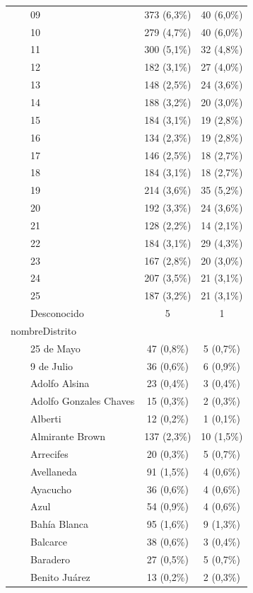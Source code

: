 \documentclass[
  spanish,
  a4paper,
]{scrreprt}
\begin{document}
\begin{table}
{\begin{tabular*}{\linewidth}{@{\extracolsep{\fill}}lcc}
    09 & 373 (6,3\%) & 40 (6,0\%) \\ 
    10 & 279 (4,7\%) & 40 (6,0\%) \\ 
    11 & 300 (5,1\%) & 32 (4,8\%) \\ 
    12 & 182 (3,1\%) & 27 (4,0\%) \\ 
    13 & 148 (2,5\%) & 24 (3,6\%) \\ 
    14 & 188 (3,2\%) & 20 (3,0\%) \\ 
    15 & 184 (3,1\%) & 19 (2,8\%) \\ 
    16 & 134 (2,3\%) & 19 (2,8\%) \\ 
    17 & 146 (2,5\%) & 18 (2,7\%) \\ 
    18 & 184 (3,1\%) & 18 (2,7\%) \\ 
    19 & 214 (3,6\%) & 35 (5,2\%) \\ 
    20 & 192 (3,3\%) & 24 (3,6\%) \\ 
    21 & 128 (2,2\%) & 14 (2,1\%) \\ 
    22 & 184 (3,1\%) & 29 (4,3\%) \\ 
    23 & 167 (2,8\%) & 20 (3,0\%) \\ 
    24 & 207 (3,5\%) & 21 (3,1\%) \\ 
    25 & 187 (3,2\%) & 21 (3,1\%) \\ 
    Desconocido & 5 & 1 \\ 
nombreDistrito &  &  \\ 
    25 de Mayo & 47 (0,8\%) & 5 (0,7\%) \\ 
    9 de Julio & 36 (0,6\%) & 6 (0,9\%) \\ 
    Adolfo Alsina & 23 (0,4\%) & 3 (0,4\%) \\ 
    Adolfo Gonzales Chaves & 15 (0,3\%) & 2 (0,3\%) \\ 
    Alberti & 12 (0,2\%) & 1 (0,1\%) \\ 
    Almirante Brown & 137 (2,3\%) & 10 (1,5\%) \\ 
    Arrecifes & 20 (0,3\%) & 5 (0,7\%) \\ 
    Avellaneda & 91 (1,5\%) & 4 (0,6\%) \\ 
    Ayacucho & 36 (0,6\%) & 4 (0,6\%) \\ 
    Azul & 54 (0,9\%) & 4 (0,6\%) \\ 
    Bahía Blanca & 95 (1,6\%) & 9 (1,3\%) \\ 
    Balcarce & 38 (0,6\%) & 3 (0,4\%) \\ 
    Baradero & 27 (0,5\%) & 5 (0,7\%) \\ 
    Benito Juárez & 13 (0,2\%) & 2 (0,3\%) \\ 

\end{tabular*}}
\end{table}
\end{document}
